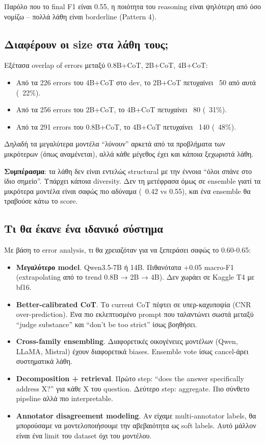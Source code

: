 \documentclass[12pt]{fphw}
\begin{document}
Παρόλο που το final F1 είναι 0.55, η ποιότητα του reasoning είναι ψηλότερη από όσο νομίζω -- πολλά λάθη είναι borderline (Pattern 4).

\subsection{Διαφέρουν οι size στα λάθη τους;}

Εξέτασα overlap of errors μεταξύ 0.8B+CoT, 2B+CoT, 4B+CoT:

\begin{itemize}
    \item Από τα 226 errors του 4B+CoT στο dev, το 2B+CoT πετυχαίνει ~50 από αυτά (~22\%).
    \item Από τα 256 errors του 2B+CoT, το 4B+CoT πετυχαίνει ~80 (~31\%).
    \item Από τα 291 errors του 0.8B+CoT, το 4B+CoT πετυχαίνει ~140 (~48\%).
\end{itemize}

Δηλαδή τα μεγαλύτερα μοντέλα ``λύνουν'' αρκετά από τα προβλήματα των μικρότερων (όπως αναμένεται), αλλά κάθε μέγεθος έχει και κάποια ξεχωριστά λάθη.

\textbf{Συμπέρασμα}: τα λάθη δεν είναι εντελώς structural με την έννοια ``όλοι σπάνε στο ίδιο σημείο''. Υπάρχει κάποια diversity. Δεν τη μετέφρασα όμως σε ensemble γιατί τα μικρότερα μοντέλα είναι σαφώς πιο αδύναμα (~0.42 vs 0.55), και ένα ensemble θα τραβούσε κάτω το score.

\subsection{Τι θα έκανε ένα ιδανικό σύστημα}

Με βάση το error analysis, τι θα χρειαζόταν για να ξεπεράσει σαφώς το 0.60-0.65:

\begin{itemize}
    \item \textbf{Μεγαλύτερο model}. Qwen3.5-7B ή 14B. Πιθανότατα +0.05 macro-F1 (extrapolating από το trend 0.8B → 2B → 4B). Δεν χωράει σε Kaggle T4 με bf16.
    \item \textbf{Better-calibrated CoT}. Το current CoT πέφτει σε υπερ-καχυποψία (CNR over-prediction). Ένα πιο εκλεπτυσμένο prompt που ταλαντώνει σωστά μεταξύ ``judge substance'' και ``don't be too strict'' ίσως βοηθήσει.
    \item \textbf{Cross-family ensembling}. Διαφορετικές οικογένειες μοντέλων (Qwen, LLaMA, Mistral) έχουν διαφορετικά biases. Ensemble vote ίσως cancel-άρει συστηματικά λάθη.
    \item \textbf{Decomposition + retrieval}. Πρώτο step: ``does the answer specifically address X?'' για κάθε X του question. Δεύτερο step: aggregate. Πιο σύνθετο pipeline αλλά πιο interpretable.
    \item \textbf{Annotator disagreement modeling}. Αν είχαμε multi-annotator labels, θα μπορούσαμε να μοντελοποιήσουμε την αβεβαιότητα ως soft labels. Αυτό μάλλον είναι ένα limit του dataset όχι του μοντέλου.
\end{itemize}
\end{document}
